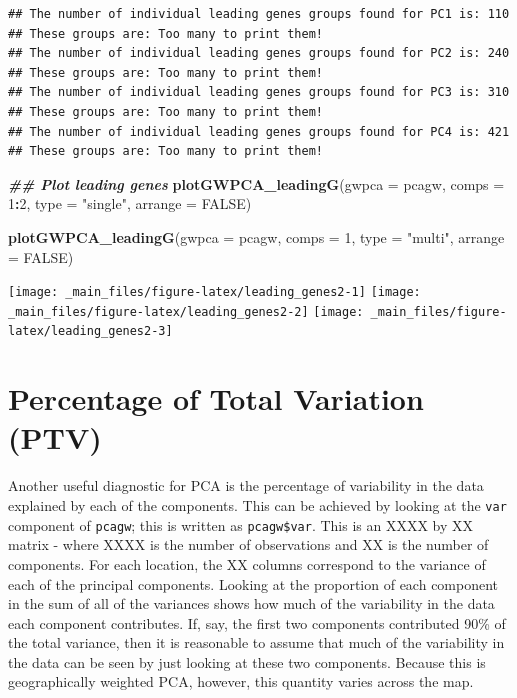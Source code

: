 \documentclass[
]{book}
\newenvironment{Shaded}{\begin{snugshade}}{\end{snugshade}}
\newcommand{\AttributeTok}[1]{\textcolor[rgb]{0.13,0.29,0.53}{#1}}
\newcommand{\ConstantTok}[1]{\textcolor[rgb]{0.56,0.35,0.01}{#1}}
\newcommand{\DecValTok}[1]{\textcolor[rgb]{0.00,0.00,0.81}{#1}}
\newcommand{\DocumentationTok}[1]{\textcolor[rgb]{0.56,0.35,0.01}{\textbf{\textit{#1}}}}
\newcommand{\FunctionTok}[1]{\textcolor[rgb]{0.13,0.29,0.53}{\textbf{#1}}}
\newcommand{\NormalTok}[1]{#1}
\newcommand{\SpecialCharTok}[1]{\textcolor[rgb]{0.81,0.36,0.00}{\textbf{#1}}}
\newcommand{\StringTok}[1]{\textcolor[rgb]{0.31,0.60,0.02}{#1}}
\begin{document}
\begin{verbatim}
## The number of individual leading genes groups found for PC1 is: 110 
## These groups are: Too many to print them!
## The number of individual leading genes groups found for PC2 is: 240 
## These groups are: Too many to print them!
## The number of individual leading genes groups found for PC3 is: 310 
## These groups are: Too many to print them!
## The number of individual leading genes groups found for PC4 is: 421 
## These groups are: Too many to print them!
\end{verbatim}

\begin{Shaded}
\begin{Highlighting}[]
\DocumentationTok{\#\# Plot leading genes}
\FunctionTok{plotGWPCA\_leadingG}\NormalTok{(}\AttributeTok{gwpca =}\NormalTok{ pcagw,}
                   \AttributeTok{comps =} \DecValTok{1}\SpecialCharTok{:}\DecValTok{2}\NormalTok{,}
                   \AttributeTok{type =} \StringTok{"single"}\NormalTok{,}
                   \AttributeTok{arrange =} \ConstantTok{FALSE}\NormalTok{)}

\FunctionTok{plotGWPCA\_leadingG}\NormalTok{(}\AttributeTok{gwpca =}\NormalTok{ pcagw,}
                   \AttributeTok{comps =} \DecValTok{1}\NormalTok{,}
                   \AttributeTok{type =} \StringTok{"multi"}\NormalTok{,}
                   \AttributeTok{arrange =} \ConstantTok{FALSE}\NormalTok{)}
\end{Highlighting}
\end{Shaded}

\texttt{[image: \_main\_files/figure-latex/leading\_genes2-1]} \texttt{[image: \_main\_files/figure-latex/leading\_genes2-2]} \texttt{[image: \_main\_files/figure-latex/leading\_genes2-3]}

\hypertarget{percentage-of-total-variation-ptv}{%
\section{Percentage of Total Variation (PTV)}\label{percentage-of-total-variation-ptv}}

Another useful diagnostic for PCA is the percentage of variability in the data explained by each of the components. This can be achieved by looking at the \texttt{var} component of \texttt{pcagw}; this is written as \texttt{pcagw\$var}. This is an XXXX by XX matrix - where XXXX is the number of observations and XX is the number of components. For each location, the XX columns correspond to the variance of each of the principal components. Looking at the proportion of each component in the sum of all of the variances shows how much of the variability in the data each component contributes. If, say, the first two components contributed 90\% of the total variance, then it is reasonable to assume that much of the variability in the data can be seen by just looking at these two components. Because this is geographically weighted PCA, however, this quantity varies across the map.
\end{document}

